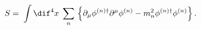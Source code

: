 \begin{equation}
S= \;
\int \dif^4 x \; \sum_n \, \Big\{ \partial_\mu \phi^{(n)\dagger}
\partial^\mu \phi^{(n)} - m_n^2 \phi^{(n)\dagger} \phi^{(n)}
\Big\} \, .
\end{equation}


